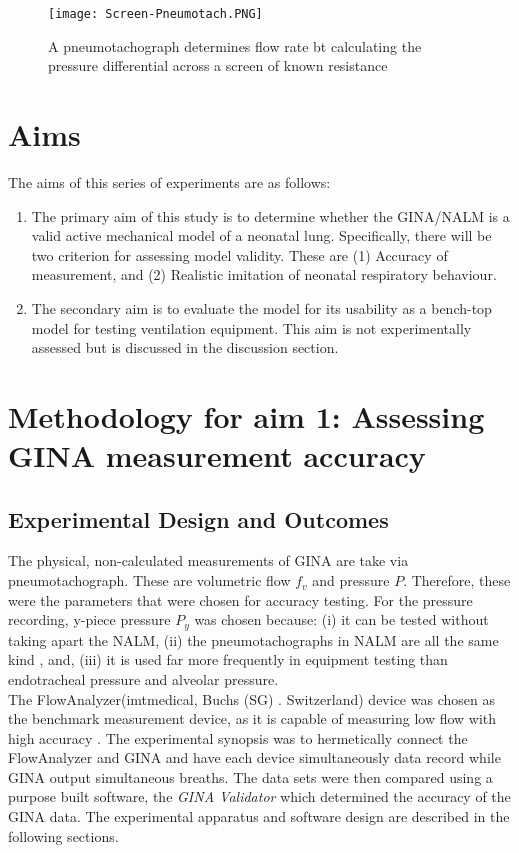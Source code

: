 \documentclass[12pt, openany, oneside]{book}
\begin{document}
\begin{figure}
	\begin{center}	
		\texttt{[image: Screen-Pneumotach.PNG]}	
		\caption[Pneumotachograph]{A pneumotachograph determines flow rate bt calculating the pressure differential across a screen of known resistance \citep{pneu}} 
		\label{fig:pneu}	
	
	\end{center}
\end{figure}


\section{Aims}
The aims of this series of experiments are as follows:
\begin{enumerate}
\item 
The primary aim of this study is to determine whether the GINA/NALM is a valid active mechanical model of a neonatal lung. Specifically, there will be two criterion for assessing model validity. These are (1) Accuracy of measurement, and (2) Realistic imitation of neonatal respiratory behaviour.
\item The secondary aim is to evaluate the model for its usability as a bench-top model for testing ventilation equipment. This aim is not experimentally assessed but is discussed in the discussion section.
\end{enumerate}

\section{Methodology for aim 1: Assessing GINA measurement accuracy}
\subsection{Experimental Design and Outcomes}
The physical, non-calculated measurements of GINA are take via pneumotachograph. These are volumetric flow $f_v$ and pressure $P$. Therefore, these were the parameters that were chosen for accuracy testing. For the pressure recording, y-piece pressure $P_y$ was chosen because: (i) it can be tested without taking apart the NALM, (ii) the pneumotachographs in NALM are all the same kind \citep{gina}, and, (iii) it is used far more frequently in equipment testing than endotracheal pressure and alveolar pressure. \\

The FlowAnalyzer\texttrademark (imtmedical, Buchs (SG) . Switzerland) device was chosen as the benchmark measurement device, as it is capable of measuring low flow with high accuracy \citep{flow}. The experimental synopsis was to hermetically connect the FlowAnalyzer and GINA and have each device simultaneously data record while GINA output simultaneous breaths. The data sets were then compared using a purpose built software, the \textit{GINA Validator} which determined the accuracy of the GINA data. The experimental apparatus and software design are described in the following sections.
\end{document}
